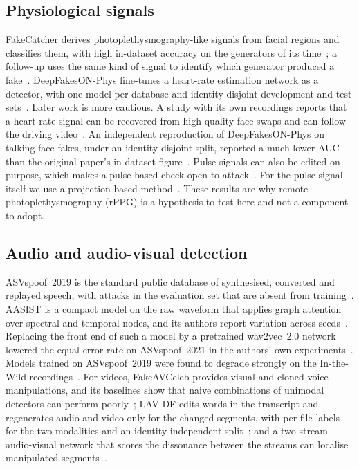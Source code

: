 \documentclass[conference,a4paper]{IEEEtran_nodash}
\begin{document}
\subsection{Physiological signals}
FakeCatcher derives photoplethysmography-like signals from facial regions and
classifies them, with high in-dataset accuracy on the generators of its
time~\cite{ciftci2020fakecatcher}; a follow-up uses the same kind of signal to
identify which generator produced a fake~\cite{ciftci2020hearts}.
DeepFakesON-Phys fine-tunes a heart-rate estimation network as a detector, with
one model per database and identity-disjoint development and test
sets~\cite{hernandez2020deepfakeson}. Later work is more cautious. A study with
its own recordings reports that a heart-rate signal can be recovered from
high-quality face swaps and can follow the driving
video~\cite{seibold2025heart}. An independent reproduction of DeepFakesON-Phys
on talking-face fakes, under an identity-disjoint split, reported a much lower
AUC than the original paper's in-dataset figure~\cite{harraq2026physio}. Pulse
signals can also be edited on purpose, which makes a pulse-based check open to
attack~\cite{lin2023ppg}. For the pulse signal itself we use a projection-based
method~\cite{wang2017pos}. These results are why remote photoplethysmography
(rPPG) is a hypothesis to test here and not a component to adopt.

\subsection{Audio and audio-visual detection}
ASVspoof~2019 is the standard public database of synthesised, converted and
replayed speech, with attacks in the evaluation set that are absent from
training~\cite{wang2020asvspoof}. AASIST is a compact model on the raw waveform
that applies graph attention over spectral and temporal nodes, and its authors
report variation across seeds~\cite{jung2021aasist}. Replacing the front end of
such a model by a pretrained wav2vec~2.0 network lowered the equal error rate
on ASVspoof~2021 in the authors' own experiments~\cite{tak2022wav2vecspoof}.
Models trained on ASVspoof~2019 were found to degrade strongly on
the In-the-Wild recordings~\cite{muller2022inthewild}. For videos,
FakeAVCeleb provides visual and cloned-voice manipulations, and its baselines
show that naive combinations of unimodal detectors can perform
poorly~\cite{khalid2022fakeavceleb}; LAV-DF edits words in the transcript and
regenerates audio and video only for the changed segments, with per-file
labels for the two modalities and an identity-independent
split~\cite{cai2022lavdf}; and a two-stream audio-visual network that scores the
dissonance between the streams can localise manipulated
segments~\cite{chugh2021notmade}.
\end{document}
